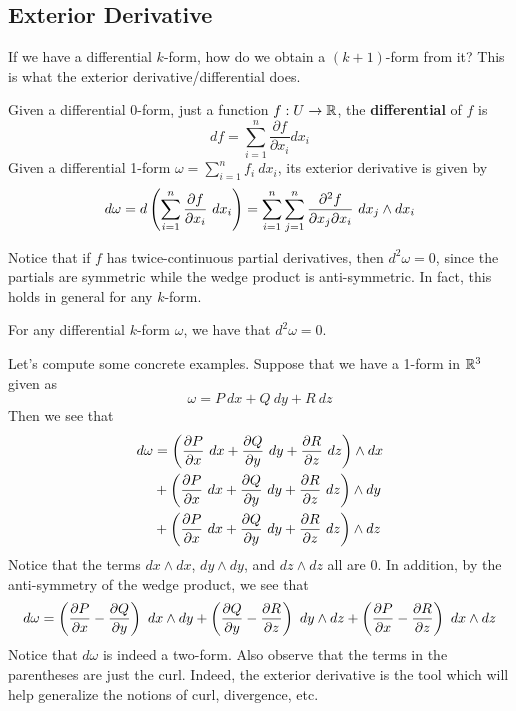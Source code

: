 \documentclass{article}
\begin{document}
        \subsection{Exterior Derivative}
        If we have a differential $k$-form, how do we obtain a $(k+1)$-form from it? This is what the exterior derivative/differential does. 
        \begin{defn}
            Given a differential 0-form, just a function $f: U\to \mathbb{R}$, the \textbf{differential} of $f$ is 
            \begin{equation*}
                df = \sum_{i=1}^n \frac{\partial f}{\partial x_i}dx_i
            \end{equation*}
            Given a differential 1-form $\omega = \sum_{i=1}^n f_i\ dx_i$, its exterior derivative is given by 
            \begin{align*}
                d\omega = d\left( \sum_{i=1}^n \frac{\partial f}{\partial x_i}\ dx_i \right) = \sum_{i=1}^n \sum_{j=1}^n \frac{\partial^2 f}{\partial x_j \partial x_i}\ dx_j \wedge dx_i
            \end{align*}
        \end{defn}
        Notice that if $f$ has twice-continuous partial derivatives, then $d^2 \omega = 0$, since the partials are symmetric while the wedge product is anti-symmetric. In fact, this holds in general for any $k$-form. 
        \begin{prop}
            For any differential $k$-form $\omega$, we have that $d^2\omega = 0$.
        \end{prop}
        Let's compute some concrete examples. Suppose that we have a 1-form in $\mathbb{R}^3$ given as 
        \begin{equation*}
            \omega = P\ dx + Q\ dy + R\ dz
        \end{equation*}
        Then we see that 
        \begin{align*}
            d\omega &= \left( \frac{\partial P}{\partial x}\ dx + \frac{\partial Q}{\partial y}\ dy + \frac{\partial R}{\partial z}\ dz \right) \wedge dx \\ 
            &+ \left( \frac{\partial P}{\partial x}\ dx + \frac{\partial Q}{\partial y}\ dy + \frac{\partial R}{\partial z}\ dz \right) \wedge dy \\ 
            &+ \left( \frac{\partial P}{\partial x}\ dx + \frac{\partial Q}{\partial y}\ dy + \frac{\partial R}{\partial z}\ dz \right) \wedge dz
        \end{align*}
        Notice that the terms $dx \wedge dx$, $dy \wedge dy$, and $dz\wedge dz$ all are 0. In addition, by the anti-symmetry of the wedge product, we see that 
        \begin{equation*}
            d\omega = \left( \frac{\partial P}{\partial x} - \frac{\partial Q}{\partial y} \right)\ dx \wedge dy + \left( \frac{\partial Q}{\partial y} - \frac{\partial R}{\partial z} \right)\ dy \wedge dz + \left( \frac{\partial P}{\partial x} - \frac{\partial R}{\partial z} \right)\ dx \wedge dz
        \end{equation*}
        Notice that $d\omega$ is indeed a two-form. Also observe that the terms in the parentheses are just the curl. Indeed, the exterior derivative is the tool which will help generalize the notions of curl, divergence, etc. 
\end{document}

